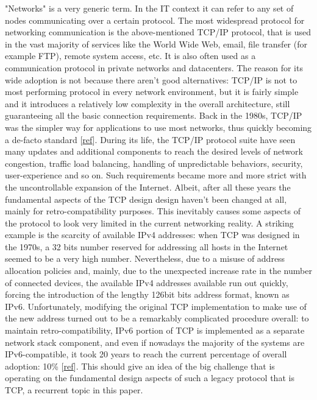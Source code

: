 "Networks" is a very generic term. In the IT context it can refer to any set of nodes communicating over a certain protocol. The most widespread protocol for networking communication is the above-mentioned TCP/IP protocol, that is used in the vast majority of services like the World Wide Web, email, file transfer (for example FTP), remote system access, etc. It is also often used as a communication protocol in private networks and datacenters. 
The reason for its wide adoption is not because there aren't good alternatives: TCP/IP is not to most performing protocol in every network environment, but it is fairly simple and it introduces a relatively low complexity in the overall architecture, still guaranteeing all the basic connection requirements. Back in the 1980s, TCP/IP was the simpler way for applications to use most networks, thus quickly becoming a de-facto standard [\href{http://www.computerworld.com/article/2593612/networking/tcp-ip.html}{ref}]. 
During its life, the TCP/IP protocol suite have seen many updates and additional components to reach the desired levels of network congestion, traffic load balancing, handling of unpredictable behaviors, security, user-experience and so on. Such requirements became more and more strict with the uncontrollable expansion of the Internet. Albeit, after all these years the fundamental aspects of the TCP design design haven't been changed at all, mainly for retro-compatibility purposes. This inevitably causes some aspects of the protocol to look very limited in the current networking reality. A striking example is the scarcity of available IPv4 addresses: when TCP was designed in the 1970s, a 32 bits number reserved for addressing all hosts in the Internet seemed to be a very high number. Nevertheless, due to a misuse of address allocation policies and, mainly, due to the unexpected increase rate in the number of connected devices, the available IPv4 addresses available run out quickly, forcing the introduction of the lengthy 126bit bits address format, known as IPv6. Unfortunately, modifying the original TCP implementation to make use of the new address turned out to be a remarkably complicated procedure overall: to maintain retro-compatibility, IPv6 portion of TCP is implemented as a separate network stack component, and even if nowadays the majority of the systems are IPv6-compatible, it took 20 years to reach the current percentage of overall adoption: 10\% [\href{http://www.google.com/intl/en/ipv6/statistics.html#tab=ipv6-adoption&tab=ipv6-adoption}{ref}]. This should give an idea of the big challenge that is operating on the fundamental design aspects of such a legacy protocol that is TCP, a recurrent topic in this paper.

